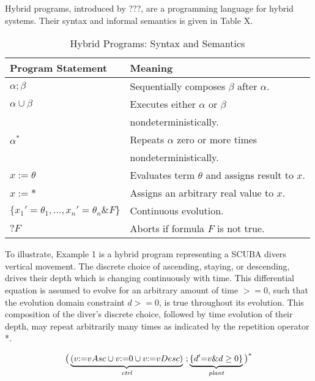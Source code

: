 \documentclass[sigconf,screen]{acmart}
\begin{document}
Hybrid programs, introduced by ???, are a programming language for hybrid systems. Their syntax and informal semantics is given in Table X.
\begin{table}
  \caption{Hybrid Programs: Syntax and Semantics} \label{tab:hps}
  \begin{tabular}{l l}
    \toprule
    Program Statement & Meaning \\
    \midrule
    $\alpha;\beta$ & Sequentially composes $\beta$ after $\alpha$. \\
    $\alpha \cup \beta$ & Executes either $\alpha$ or $\beta$ \\ & nondeterministically.\\
    $\alpha^*$ & Repeats $\alpha$ zero or more times \\& nondeterministically.\\
    $x := \theta$ & Evaluates term $\theta$ and assigns result to $x$. \\
    $x := *$ & Assigns an arbitrary real value to $x$. \\
    $\{x_1'=\theta_1,...,x_n'=\theta_n \& F\}$ & Continuous evolution\footnotemark. \\
    $?F$ & Aborts if formula $F$ is not true.\\
    \bottomrule
  \end{tabular}
\end{table}
  
To illustrate, Example 1 is a hybrid program representing a SCUBA divers vertical movement. The discrete choice of ascending, staying, or descending, drives their depth which is changing continuously with time. This differential equation is assumed to evolve for an arbitrary amount of time $>=0$, such that the evolution domain constraint $d>=0$, is true throughout its evolution. This composition of the diver's discrete choice, followed by time evolution of their depth, may repeat arbitrarily many times as indicated by the repetition operator *.
\begin{example}
\label{ex:simpleDiver}
\[
    {
      \big(\underbrace{(v{:=}vAsc \cup v{:=} 0 \cup v{:=}vDesc)}_{\textit{ctrl}}\ ;
      \underbrace{\{d'{=}v \& d \ge 0\}}_{\textit{plant}}\big)
    }^{*}
\]

\end{example}
\end{document}
